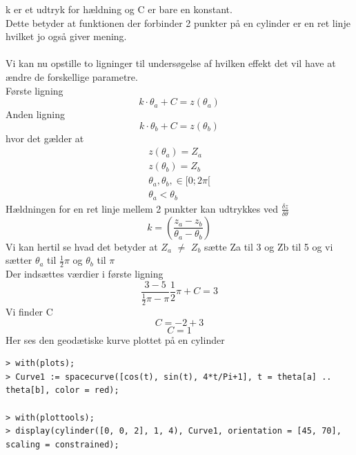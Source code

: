 k er et udtryk for hældning og C er bare en konstant.
\\
Dette betyder at funktionen der forbinder 2 punkter på en cylinder er en ret linje hvilket jo også giver mening.
\\
\\
Vi kan nu opstille to ligninger til undersøgelse af hvilken effekt det vil have at ændre de forskellige parametre.
\\
Første ligning
\begin{equation}
k\cdot \theta_a + C = z(\theta_a)
\end{equation}
Anden ligning
\begin{equation}
k\cdot \theta_b + C = z(\theta_b)
\end{equation}
hvor det gælder at
\begin{equation}
\begin{gathered}
z(\theta_a)=Z_a \\
z(\theta_b)=Z_b\\
\theta_a,\theta_b,\in[0;2\pi[ \\
\theta_a < \theta_b
\end{gathered}
\end{equation}
Hældningen for en ret linje mellem 2 punkter kan udtrykkes ved $\frac{\delta z}{\delta \theta}$
\begin{equation}
k=(\frac{z_a-z_b}{\theta_a-\theta_b})
\end{equation}
Vi kan hertil se hvad det betyder at $Z_a$ $\neq$
$Z_b$ sætte Za til 3 og Zb til 5 og vi sætter $\theta_a$ til $\frac{1}{2} \pi$ og $\theta_b$ til $\pi$
\\
Der indsættes værdier i første ligning
\begin{equation}
\frac{3-5}{\frac{1}{2}\pi-\pi}\frac{1}{2} \pi + C = 3
\end{equation}
Vi finder C
\begin{equation}
C = -2+3
\end{equation}
\begin{equation}
C = 1
\end{equation}
Her ses den geodætiske kurve plottet på en cylinder
\begin{lstlisting}[caption={Plot commands brugt for nedenstående figur}]
> with(plots);
> Curve1 := spacecurve([cos(t), sin(t), 4*t/Pi+1], t = theta[a] .. theta[b], color = red);

> with(plottools);
> display(cylinder([0, 0, 2], 1, 4), Curve1, orientation = [45, 70], scaling = constrained);

\end{lstlisting}

